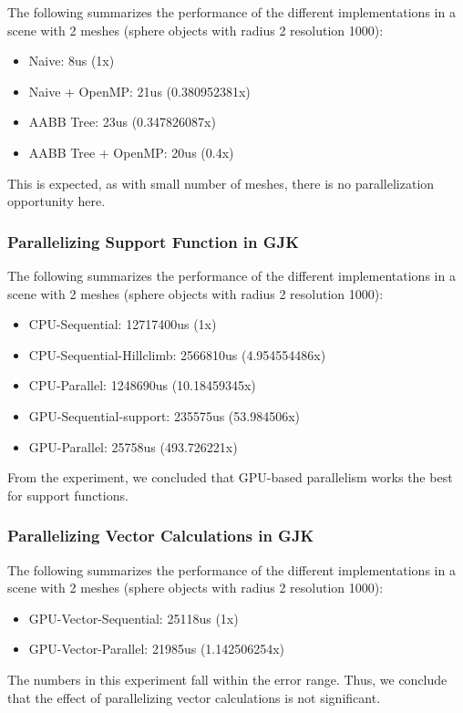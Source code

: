 \documentclass[12pt,fleqn]{article}
\begin{document}
The following summarizes the performance of the different implementations in a scene with 2 meshes (sphere objects with radius 2 resolution 1000):
\begin{itemize}
    \item Naive: 8us (1x)
    \item Naive + OpenMP: 21us (0.380952381x)
    \item AABB Tree: 23us (0.347826087x)
    \item AABB Tree + OpenMP: 20us (0.4x)
\end{itemize}

This is expected, as with small number of meshes, there is no parallelization opportunity here.


\subsubsection{Parallelizing Support Function in GJK}
The following summarizes the performance of the different implementations in a scene with 2 meshes (sphere objects with radius 2 resolution 1000):
\begin{itemize}
    \item CPU-Sequential: 12717400us (1x)
    \item CPU-Sequential-Hillclimb: 2566810us (4.954554486x)
    \item CPU-Parallel: 1248690us (10.18459345x)
    \item GPU-Sequential-support: 235575us (53.984506x)
    \item GPU-Parallel: 25758us (493.726221x)
\end{itemize}
From the experiment, we concluded that GPU-based parallelism works the best for support functions.


\subsubsection{Parallelizing Vector Calculations in GJK}
The following summarizes the performance of the different implementations in a scene with 2 meshes (sphere objects with radius 2 resolution 1000):
\begin{itemize}
    \item GPU-Vector-Sequential: 25118us (1x)
    \item GPU-Vector-Parallel: 21985us (1.142506254x)
    \end{itemize}
The numbers in this experiment fall within the error range. Thus, we conclude that the effect of parallelizing vector calculations is not significant.
\end{document}
